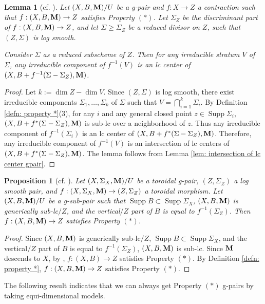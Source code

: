 \documentclass[11pt]{amsart}
\numberwithin{equation}{section}
\newcommand{\Mm}{{\bf{M}}}
\newcommand{\Supp}{\operatorname{Supp}}
\newtheorem{lem}[thm]{Lemma}
\newtheorem{prop}[thm]{Proposition}
\theoremstyle{definition}
\theoremstyle{definition}
\theoremstyle{definition}
\begin{document}
\begin{lem}[cf. {\cite[Lemma 2.15]{ACSS21}}]\label{lem: lcc property* pullback} 
Let $(X,B,\Mm)/U$ be a g-pair and $f: X\rightarrow Z$ a contraction such that $f: (X,B,\Mm)\rightarrow Z$ satisfies Property $(*)$. Let $\Sigma_Z$ be the discriminant part of $f: (X,B,\Mm)\rightarrow Z$, and let $\Sigma\geq\Sigma_Z$ be a reduced divisor on $Z$, such that $(Z,\Sigma)$ is log smooth.

Consider $\Sigma$ as a reduced subscheme of $Z$. Then for any irreducible stratum $V$ of $\Sigma$, any irreducible component of $f^{-1}(V)$ is an lc center of $(X,B+f^{-1}(\Sigma-\Sigma_Z),\Mm)$.
\end{lem}
\begin{proof} 
Let $k:=\dim Z-\dim V$. Since $(Z,\Sigma)$ is log smooth, there exist irreducible components $\Sigma_1,\dots, \Sigma_k$ of $\Sigma$ such that $V=\bigcap_{i=1}^k \Sigma_i$. By Definition \ref{defn: property *}(3), for any $i$ and any general closed point $z\in\Supp\Sigma_i$, $(X,B+f^*(\Sigma-\Sigma_Z),\Mm)$ is sub-lc over a neighborhood of $z$. Thus any irreducible component of $f^{-1}(\Sigma_i)$ is an lc center of $(X,B+f^*(\Sigma-\Sigma_Z),\Mm)$. Therefore, any irreducible component of $f^{-1}(V)$ is an intersection of lc centers of $(X,B+f^*(\Sigma-\Sigma_Z),\Mm)$. The lemma follows from Lemma \ref{lem: intersection of lc center gpair}.
\end{proof}


\begin{prop}[cf. {\cite[Proposition 2.16]{ACSS21}}]\label{prop: weak ss satisfies *}
Let $(X,\Sigma_X,\Mm)/U$ be a toroidal g-pair, $(Z,\Sigma_Z)$ a log smooth pair, and $f: (X,\Sigma_X,\Mm)\rightarrow (Z,\Sigma_Z)$ a toroidal morphism. Let $(X,B,\Mm)/U$ be a g-sub-pair such that $\Supp B\subset \Supp\Sigma_X$, $(X,B,\Mm)$ is generically sub-lc$/Z$, and the vertical$/Z$ part of $B$ is equal to  $f^{-1}(\Sigma_Z)$. Then $f: (X,B,\Mm)\rightarrow Z$ satisfies Property $(*)$.
\end{prop}
\begin{proof}
Since $(X,B,\Mm)$ is generically sub-lc$/Z$, $\Supp B\subset \Supp\Sigma_X$, and the vertical$/Z$ part of $B$ is equal to  $f^{-1}(\Sigma_Z)$, $(X,B,\Mm)$ is sub-lc. Since $\Mm$ descends to $X$, by \cite[Proposition 2.16]{ACSS21}, $f: (X,B)\rightarrow Z$ satisfies Property $(*)$. By Definition \ref{defn: property *}, $f: (X,B,\Mm)\rightarrow Z$ satisfies Property $(*)$.
\end{proof}

The following result indicates that we can always get Property $(*)$ g-pairs by taking equi-dimensional models.
\end{document}
